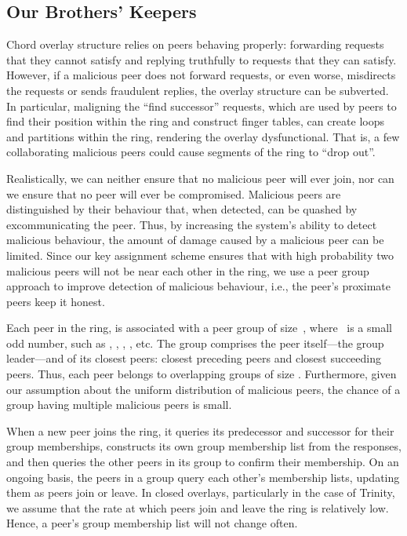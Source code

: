 \documentclass[11pt]{article}
\begin{document}
\subsection{Our Brothers' Keepers}
Chord overlay structure relies on peers behaving properly: forwarding
requests that they cannot satisfy and replying truthfully to requests
that they can satisfy.  However, if a malicious peer does not forward
requests, or even worse, misdirects the requests or sends fraudulent
replies, the overlay structure can be subverted.  In particular,
maligning the ``find successor'' requests, which are used by peers
to find their position within the ring and construct finger tables,
can create loops and partitions within the ring, rendering the
overlay dysfunctional.  That is, a few collaborating malicious peers
could cause segments of the ring to ``drop out''.

Realistically, we can neither ensure that no malicious peer will
ever join, nor can we ensure that no peer will ever be compromised.
Malicious peers are distinguished by their behaviour that, when
detected, can be quashed by excommunicating the peer.  Thus, by
increasing the system's ability to detect malicious behaviour, the
amount of damage caused by a malicious peer can be limited.  Since
our key assignment scheme ensures that with high probability two
malicious peers will not be near each other in the ring, we use a
peer group approach to improve detection of malicious behaviour,
i.e., the peer's proximate peers keep it honest.

Each peer in the ring, is associated with a peer group of size~,
where~ is a small odd number, such as , , , , etc.
The group comprises the peer itself---the group leader---and  of its closest peers:  closest preceding peers
and  closest succeeding peers.  Thus, each peer
belongs to  overlapping groups of size .   Furthermore, given
our assumption about the uniform distribution of malicious peers,
the chance of a group having multiple malicious peers is small.

When a new peer joins the ring, it queries its predecessor and
successor for their group memberships, constructs its own group
membership list from the responses, and then queries the other peers
in its group to confirm their membership.  On an ongoing basis, the
peers in a group query each other's membership lists, updating them
as peers join or leave.  In closed overlays, particularly in the
case of Trinity, we assume that the rate at which peers join and
leave the ring is relatively low.  Hence, a peer's group membership
list will not change often.
\end{document}
